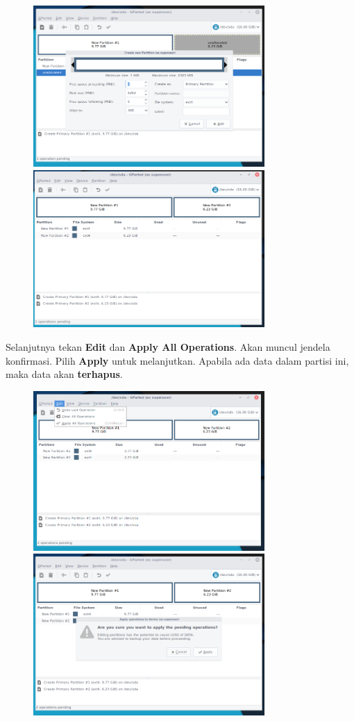 \documentclass[12pt,]{article}
\begin{document}
	\begin{figure}[h]
		\centering
		\includegraphics[width=250pt]{installhdd/step_10}
		\includegraphics[width=250pt]{installhdd/step_11}
	\end{figure}

	Selanjutnya tekan \textbf{Edit} dan \textbf{Apply All Operations}.
	Akan muncul jendela konfirmasi. 
	Pilih \textbf{Apply} untuk melanjutkan.
	Apabila ada data dalam partisi ini, maka data akan \textbf{terhapus}.
	
	\newpage
	\begin{figure}[h]
		\centering
		\includegraphics[width=250pt]{installhdd/step_12}
		\includegraphics[width=250pt]{installhdd/step_13}
	\end{figure}
\end{document}
